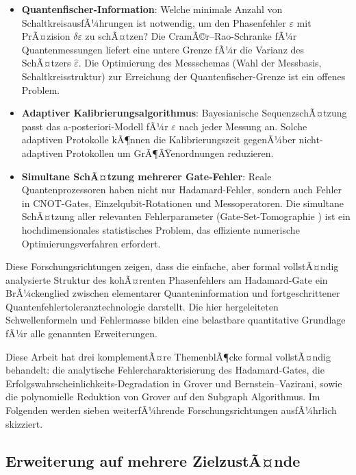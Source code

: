 ﻿\documentclass[11pt,a4paper]{article}
\theoremstyle{definition}
\newcommand{\eps}{\varepsilon}
\begin{document}
\begin{itemize}
  \item \textbf{Quantenfischer-Information}: Welche minimale Anzahl von
        SchaltkreisausfÃ¼hrungen ist notwendig, um den Phasenfehler $\eps$
        mit PrÃ¤zision $\delta\eps$ zu schÃ¤tzen?  Die CramÃ©r--Rao-Schranke
        fÃ¼r Quantenmessungen \cite{Braunstein1994} liefert eine untere Grenze
        fÃ¼r die Varianz des SchÃ¤tzers $\hat\eps$.  Die Optimierung des
        Messschemas (Wahl der Messbasis, Schaltkreisstruktur) zur Erreichung
        der Quantenfischer-Grenze ist ein offenes Problem.

  \item \textbf{Adaptiver Kalibrierungsalgorithmus}: Bayesianische
        SequenzschÃ¤tzung \cite{Granade2012} passt das a-posteriori-Modell
        fÃ¼r $\eps$ nach jeder Messung an.  Solche adaptiven Protokolle
        kÃ¶nnen die Kalibrierungszeit gegenÃ¼ber nicht-adaptiven Protokollen
        um GrÃ¶ÃŸenordnungen reduzieren.

  \item \textbf{Simultane SchÃ¤tzung mehrerer Gate-Fehler}: Reale
        Quantenprozessoren haben nicht nur Hadamard-Fehler, sondern auch
        Fehler in CNOT-Gates, Einzelqubit-Rotationen und Messoperatoren.
        Die simultane SchÃ¤tzung aller relevanten Fehlerparameter
        (Gate-Set-Tomographie \cite{Blume-Kohout2017}) ist ein
        hochdimensionales statistisches Problem, das effiziente
        numerische Optimierungsverfahren erfordert.
\end{itemize}

Diese Forschungsrichtungen zeigen, dass die einfache, aber formal vollstÃ¤ndig
analysierte Struktur des kohÃ¤renten Phasenfehlers am Hadamard-Gate ein
BrÃ¼ckenglied zwischen elementarer Quanteninformation und fortgeschrittener
Quantenfehlertoleranztechnologie darstellt.  Die hier hergeleiteten
Schwellenformeln und Fehlermasse bilden eine belastbare quantitative Grundlage
fÃ¼r alle genannten Erweiterungen.


Diese Arbeit hat drei komplementÃ¤re ThemenblÃ¶cke formal vollstÃ¤ndig behandelt:
die analytische Fehlercharakterisierung des Hadamard-Gates, die
Erfolgswahrscheinlichkeits-Degradation in Grover und Bernstein--Vazirani,
sowie die polynomielle Reduktion von Grover auf den Subgraph Algorithmus.
Im Folgenden werden sieben weiterfÃ¼hrende Forschungsrichtungen ausfÃ¼hrlich
skizziert.

\subsection{Erweiterung auf mehrere ZielzustÃ¤nde}
\label{subsec:outlook_multi}
\end{document}
